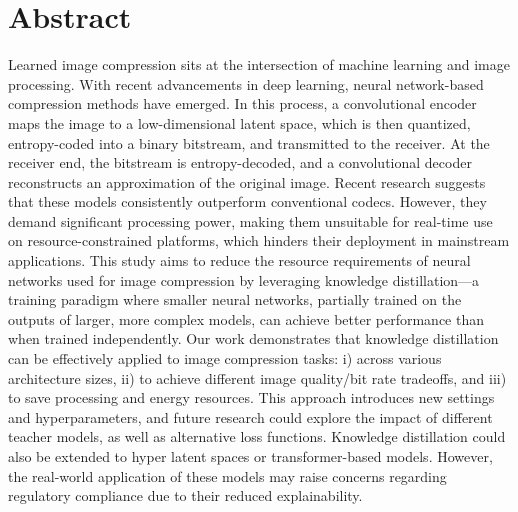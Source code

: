 \chapter*{Abstract}
Learned image compression sits at the intersection of machine learning and image processing. With recent advancements in deep learning, neural network-based compression methods have emerged. In this process, a convolutional encoder maps the image to a low-dimensional latent space, which is then quantized, entropy-coded into a binary bitstream, and transmitted to the receiver. At the receiver end, the bitstream is entropy-decoded, and a convolutional decoder reconstructs an approximation of the original image. Recent research suggests that these models consistently outperform conventional codecs. However, they demand significant processing power, making them unsuitable for real-time use on resource-constrained platforms, which hinders their deployment in mainstream applications. This study aims to reduce the resource requirements of neural networks used for image compression by leveraging knowledge distillation—a training paradigm where smaller neural networks, partially trained on the outputs of larger, more complex models, can achieve better performance than when trained independently. Our work demonstrates that knowledge distillation can be effectively applied to image compression tasks: i) across various architecture sizes, ii) to achieve different image quality/bit rate tradeoffs, and iii) to save processing and energy resources. This approach introduces new settings and hyperparameters, and future research could explore the impact of different teacher models, as well as alternative loss functions. Knowledge distillation could also be extended to hyper latent spaces or transformer-based models. However, the real-world application of these models may raise concerns regarding regulatory compliance due to their reduced explainability.